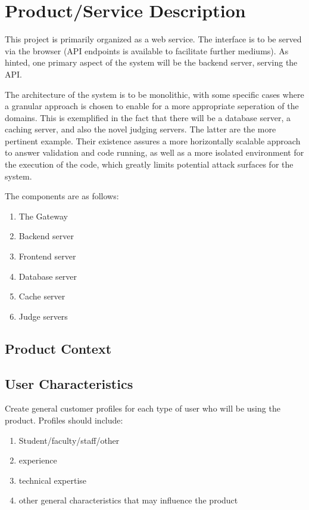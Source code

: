 \section{Product/Service Description}

This project is primarily organized as a web service. The interface is to be served via the browser (API endpoints is available to facilitate further mediums). As hinted, one primary aspect of the system will be the 
backend server, serving the API.

The architecture of the system is to be monolithic, with some specific cases where a granular approach is chosen to enable for a more appropriate seperation of the domains. This is exemplified in the
fact that there will be a database server, a caching server, and also the novel judging servers. The latter are the more pertinent example. Their existence assures a more horizontally scalable approach to answer validation and code
running, as well as a more isolated environment for the execution of the code, which greatly limits potential attack surfaces for the system.

The components are as follows:
\begin{enumerate}
    \item The Gateway
    \item Backend server
    \item Frontend server
    \item Database server
    \item Cache server
    \item Judge servers
\end{enumerate}

\subsection{Product Context}

\subsection{User Characteristics}
Create general customer profiles for each type of user who will be using the product. Profiles should include:

\begin{enumerate}
    \item{Student/faculty/staff/other}
    \item{experience}
    \item{technical expertise}
    \item{other general characteristics that may influence the product}
\end{enumerate}

